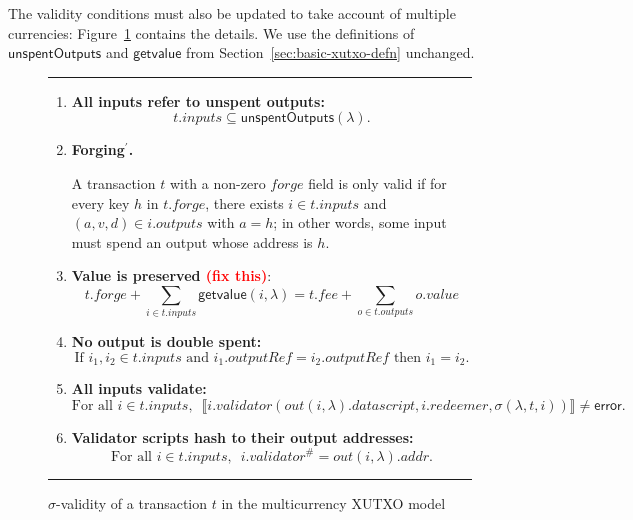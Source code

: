 \documentclass[a4paper]{article}
\newcommand{\red}[1]{\textcolor{red}{#1}}
\theoremstyle{definition}  %
\newcommand\rfskip{7pt}
\newenvironment{ruledfigure}[1]{\begin{figure}[#1]\hrule\vspace{\rfskip}}{\vspace{\rfskip}\hrule\end{figure}}
\newcommand{\mi}[1]{\ensuremath{\mathit{#1}}}
\newcommand{\inputs}{\mi{inputs}}
\newcommand{\outputs}{\mi{outputs}}
\newcommand{\forge}{\mi{forge}}
\newcommand{\fee}{\mi{fee}}
\newcommand{\addr}{\mi{addr}}
\newcommand{\val}{\mi{value}}  %
\newcommand{\validator}{\mi{validator}}
\newcommand{\redeemer}{\mi{redeemer}}
\newcommand{\datascript}{\mi{datascript}}
\newcommand{\txout}{\mi{out}}
\newcommand{\getvalue}{\msf{getvalue}}
\newcommand{\msf}[1]{\ensuremath{\mathsf{#1}}}
\newcommand{\unspent}{\msf{unspentOutputs}}
\begin{document}
\vspace{10pt}
\noindent The validity conditions must also be updated to take account
of multiple currencies: Figure~\ref{fig:mc-xutxo-validity} contains
the details.  We use the definitions of \unspent{}  and
\getvalue{} from Section~\ref{sec:basic-xutxo-defn} unchanged.

\begin{ruledfigure}{H}
  \begin{enumerate}
    \item \label{all-inputs-refer-to-unspent-outputs-2} \textbf{All
      inputs refer to unspent outputs:}
      \[
        t.\inputs \subseteq \unspent(\lambda).
      \]
    \item\label{forging-2} \textbf{Forging$^{\prime}$.}
      \begin{center}
        \parbox{0.8\textwidth}{
          A transaction $t$ with a non-zero \forge{} field is only valid if for
          every key $h$ in $t.\forge$, there exists $i \in t.\inputs$
          and $(a,v,d) \in i.\outputs$ with $a =h$; in other words, some input
          must spend an output whose address is $h$.
          }
      
      \end{center}
    \item \label{value-is-preserved-2} \textbf{Value is preserved \red{(fix this)}}:
    \[
      t.\forge + \sum_{i \in t.\inputs} \getvalue(i, \lambda) = t.\fee + \sum_{o \in t.\outputs} o.\val
    \]
    \item \label{no-double-spending-2} \textbf{No output is double spent:}
    \[
     \textrm{If } i_1, i_2 \in t.\inputs \textrm{ and }  i_1.\mathit{outputRef} = i_2.\mathit{outputRef}
     \textrm{ then } i_1 = i_2.
    \]
    \item\label{all-inputs-validate-2} \textbf{All inputs validate:}
    \[
    \textrm{For all } i \in t.\inputs,\enspace \llbracket
    i.\validator(\txout(i,
    \lambda).\datascript,i.\redeemer, \sigma(\lambda, t, i))
    \rrbracket \ne \textsf{error}.
      \]
    \item\label{validator-scripts-hash-2} \textbf{Validator scripts hash to their output addresses:}
    \[
      \textrm{For all } i \in t.\inputs,\enspace i.\validator^{\#} = \txout(i, \lambda).\addr.
    \]
  \end{enumerate}
  \caption{$\sigma$-validity of a transaction $t$ in the multicurrency XUTXO model}
  \label{fig:mc-xutxo-validity}

\end{ruledfigure}
\end{document}
